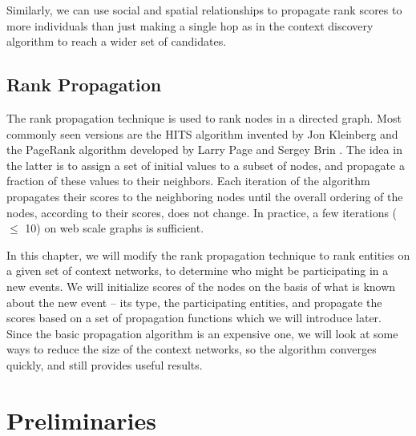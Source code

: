 Similarly, we can use social and spatial relationships to propagate rank scores to more individuals than just making a single hop as in the context discovery algorithm to reach a wider set of candidates.

\subsection{Rank Propagation}

The rank propagation technique is used to rank nodes in a directed graph. Most commonly seen versions are the HITS algorithm invented by Jon Kleinberg \cite{kleinberg1999authoritative} and the PageRank algorithm developed by Larry Page and Sergey Brin \cite{page1999pagerank}. The idea in the latter is to assign a set of initial values to a subset of nodes, and propagate a fraction of these values to their neighbors. Each iteration of the algorithm propagates their scores to the neighboring nodes until the overall ordering of the nodes, according to their scores, does not change. In practice, a few iterations ($\leq$ 10) on web scale graphs is sufficient.

In this chapter, we will modify the rank propagation technique to rank entities on a given set of context networks, to determine who might be participating in a new events. We will initialize scores of the nodes on the basis of what is known about the new event -- its type, the participating entities, and propagate the scores based on a set of propagation functions which we will introduce later. Since the basic propagation algorithm is an expensive one, we will look at some ways to reduce the size of the context networks, so the algorithm converges quickly, and still provides useful results.

\section{Preliminaries}

